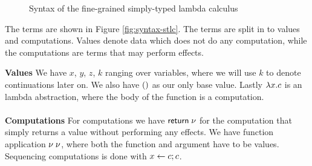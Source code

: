 {%

\begin{figure}
\caption{Syntax of the fine-grained simply-typed lambda calculus}
\centering
{}
\end{figure}

The terms are shown in Figure \ref{fig:syntax-stlc}.
The terms are split in to values and computations.
Values denote data which does not do any computation, while the computations are terms that may perform effects.

\textbf{Values} We have $x$, $y$, $z$, $k$ ranging over variables, where we will use $k$ to denote continuations later on.
We also have $()$ as our only base value. Lastly $\lambda x . c$ is an lambda abstraction, where the body of the function is a computation.
\\\\
\textbf{Computations} For computations we have $\mathsf{return} \; \nu$ for the computation that simply returns a value without performing any effects. We have function application $\nu \; \nu$, where both the function and argument have to be values. Sequencing computations is done with $x \leftarrow c ; c$.


}
